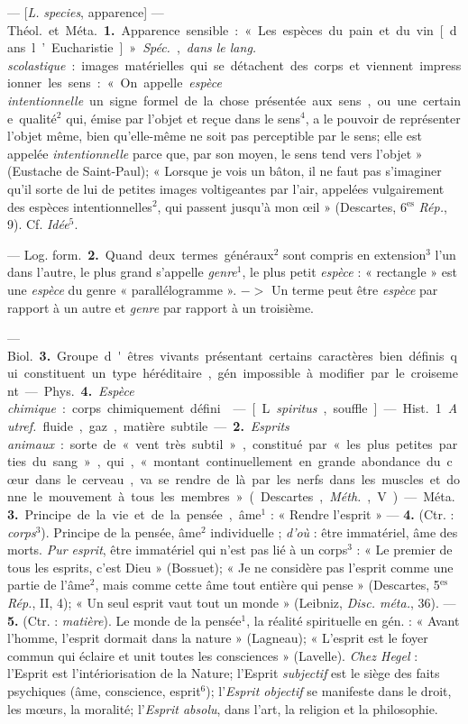 \begin{itemize}[leftmargin=1cm, label=, itemsep=1pt]
 — [{\it L.} {\it species}, apparence] —
\si{Théol.} et \si{Méta.} {\bf 1.} Apparence sensible : « Les espèces
du pain et du vin [dans l’Eucharistie] ». {\it Spéc.},
{\it dans le lang. scolastique} : images
matérielles qui se détachent des
corps et viennent impressionner les
sens : « On appelle {\it espèce intentionnelle} un signe formel de la chose
présentée aux sens, ou une certaine
qualité$^2$ qui, émise par l'objet et
reçue dans le sens$^4$, a le pouvoir de
représenter l’objet même, bien
qu'elle-même ne soit pas perceptible par le sens; elle est appelée
{\it intentionnelle} parce que, par son
moyen, le sens tend vers l’objet »
(Eustache de Saint-Paul); « Lorsque
je vois un bâton, il ne faut pas
s’imaginer qu'il sorte de lui de petites images voltigeantes par l’air,
appelées vulgairement des espèces
intentionnelles$^2$, qui passent jusqu’à
mon œil » (Descartes, 6$^\text{es}$ {\it Rép.}, 9).
Cf. {\it Idée}$^5$.

— \si{Log. form.} {\bf 2.} Quand deux termes
généraux$^2$ sont compris en extension$^3$ l’un dans l’autre, le plus grand
s'appelle {\it genre}$^1$, le plus petit {\it espèce} :
« rectangle » est une {\it espèce} du genre
« parallélogramme ». $->$ Un terme
peut être {\it espèce} par rapport à un
autre et {\it genre} par rapport à un troisième.

— \si{Biol.} {\bf 3.} Groupe d'êtres vivants
présentant certains caractères bien
définis qui constituent un type
héréditaire, gén. impossible à modifier par le croisement.

— \si{Phys.} {\bf 4.} {\it Espèce chimique} :
corps chimiquement défini.

 — [L. {\it spiritus}, souffle] — \si{Hist.}
1. {\it Autref.} fluide, gaz, matière
subtile. — {\bf 2.} {\it Esprits animaux} : sorte
de « vent très subtil », constitué
par « les plus petites parties du
sang », qui, « montant continuellement en grande abondance du
cœur dans le cerveau, va se rendre
de là par les nerfs dans les muscles
et donne le mouvement à tous les
membres » (Descartes, {\it Méth.}, V).

— \si{Méta.} {\bf 3.} Principe de la vie et de
la pensée, âme$^1$ : « Rendre l'esprit »
— {\bf 4.} (Ctr. : {\it corps}$^3$). Principe de la
pensée, âme$^2$ individuelle ; {\it d'où} :
être immatériel, âme des morts.
{\it Pur esprit}, être immatériel qui n’est
pas lié à un corps$^3$ : « Le premier de
tous les esprits, c’est Dieu » (Bossuet); « Je ne considère pas l'esprit
comme une partie de l'âme$^2$, mais
comme cette âme tout entière qui
pense » (Descartes, 5$^\text{es}$ {\it Rép.}, II, 4);
« Un seul esprit vaut tout un monde »
(Leibniz, {\it Disc. méta.}, 36). — {\bf 5.} (Ctr. :
{\it matière}). Le monde de la pensée$^1$, la
réalité spirituelle en gén. : « Avant
l’homme, l'esprit dormait dans la
nature » (Lagneau); « L'esprit est
le foyer commun qui éclaire et unit
toutes les consciences » (Lavelle).
{\it Chez Hegel} : l'Esprit est l’intériorisation
de la Nature; l'Esprit {\it subjectif} est le siège des faits psychiques
(âme, conscience, esprit$^6$); l'{\it Esprit objectif} se manifeste
dans le droit, les mœurs, la moralité; l'{\it Esprit absolu}, dans l’art,
la religion et la philosophie.


\end{itemize}
